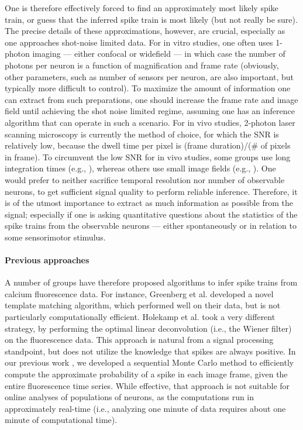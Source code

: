 One is therefore effectively forced to find an approximately most likely spike train, or guess that the inferred spike train is most likely (but not really be sure).  The precise details of these approximations, however, are crucial, especially as one approaches shot-noise limited data. For in vitro studies, one often uses 1-photon imaging --- either confocal or widefield --- in which case the number of photons per neuron is a function of magnification and frame rate (obviously, other parameters, such as number of sensors per neuron, are also important, but typically more difficult to control).  To maximize the amount of information one can extract from such preparations, one should increase the frame rate and image field until achieving the shot noise limited regime, assuming one has an inference algorithm that can operate in such a scenario.  For in vivo studies, 2-photon laser scanning microscopy is currently the method of choice, for which the SNR is relatively low,  because the dwell time per pixel is (frame duration)/($\#$ of pixels in frame).  To circumvent the low SNR for in vivo studies, some groups use long integration times (e.g., \cite{OhkiReid06}), whereas others use small image fields (e.g., \cite{KerrHelmchen07}).  One would prefer to neither sacrifice temporal resolution nor number of observable neurons, to get sufficient signal quality to perform reliable inference.  Therefore, it is of the utmost importance to extract as much information as possible from the signal; especially if one is asking quantitative questions about the statistics of the spike trains from the observable neurons --- either spontaneously or in relation to some sensorimotor stimulus.

\paragraph{Previous approaches}

A number of groups have therefore proposed algorithms to infer spike trains from calcium fluorescence data.  For instance, Greenberg et al. \cite{GreenbergKerr08} developed a novel template matching algorithm, which performed well on their data, but is not particularly computationally efficient.  Holekamp et al. \cite{HolekampHoly08} took a very different strategy, by performing the optimal linear deconvolution (i.e., the Wiener filter) on the fluorescence data.  This approach is natural from a signal processing standpoint, but does not utilize the knowledge that spikes are always positive.  In our previous work \cite{VogelsteinPaninski09}, we developed a sequential Monte Carlo method to efficiently compute the approximate probability of a spike in each image frame, given the entire fluorescence time series.   While effective, that approach is not suitable for online analyses of populations of neurons, as the computations run in approximately real-time (i.e., analyzing one minute of data requires about one minute of computational time).

